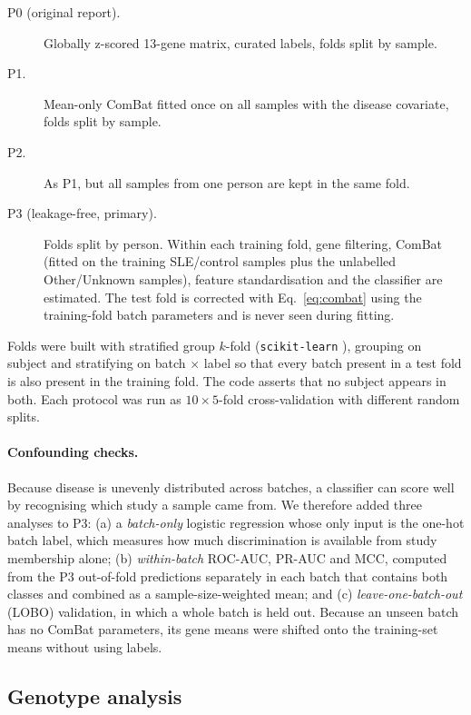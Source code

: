 \documentclass[11pt]{article}
\begin{document}
\begin{description}
  \item[P0 (original report).] Globally z-scored 13-gene matrix, curated labels, folds split by sample.
  \item[P1.] Mean-only ComBat fitted once on all samples with the disease covariate, folds split by sample.
  \item[P2.] As P1, but all samples from one person are kept in the same fold.
  \item[P3 (leakage-free, primary).] Folds split by person. Within each training fold, gene filtering, ComBat (fitted on the training SLE/control samples plus the unlabelled Other/Unknown samples), feature standardisation and the classifier are estimated. The test fold is corrected with Eq.~\eqref{eq:combat} using the training-fold batch parameters and is never seen during fitting.
\end{description}

Folds were built with stratified group $k$-fold (\texttt{scikit-learn} \citep{pedregosa2011}), grouping on subject and stratifying on batch $\times$ label so that every batch present in a test fold is also present in the training fold. The code asserts that no subject appears in both. Each protocol was run as $10\times5$-fold cross-validation with different random splits.

\paragraph{Confounding checks.} Because disease is unevenly distributed across batches, a classifier can score well by recognising which study a sample came from. We therefore added three analyses to P3: (a) a \emph{batch-only} logistic regression whose only input is the one-hot batch label, which measures how much discrimination is available from study membership alone; (b) \emph{within-batch} ROC-AUC, PR-AUC and MCC, computed from the P3 out-of-fold predictions separately in each batch that contains both classes and combined as a sample-size-weighted mean; and (c) \emph{leave-one-batch-out} (LOBO) validation, in which a whole batch is held out. Because an unseen batch has no ComBat parameters, its gene means were shifted onto the training-set means without using labels.

\subsection{Genotype analysis}
\end{document}
